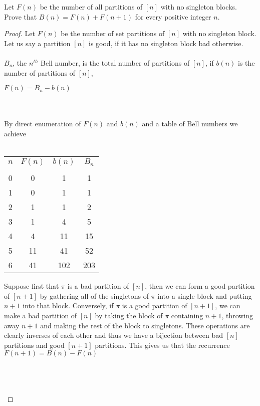 \documentclass[12pt]{article}
\newenvironment{problem}[2][Problem]{\begin{trivlist}
\item[\hskip \labelsep {\bfseries #1}\hskip \labelsep {\bfseries #2.}]}{\end{trivlist}}
\begin{document}
\begin{problem}{4}
Let $F(n)$ be the number of all partitions of $[n]$ with no singleton blocks. Prove that $B(n) = F(n) + F(n+1)$ for every positive integer $n$.
\end{problem}

\begin{proof}
Let $F(n)$ be the number of set partitions of $[n]$ with no singleton block. Let us say a partition $[n]$ is good, if it has no singleton block bad otherwise. \\ \\
$B_n$, the $n^{th}$ Bell number, is the total number of partitions of $[n]$, if $b(n)$ is the number of partitions of $[n]$, \\
\centerline{$F(n) = B_n - b(n)$} \\ \\ 
By direct enumeration of $F(n)$ and $b(n)$ and a table of Bell numbers we achieve \\ \\
\begin{center}
\begin{tabular}{ c c c c}
 $n$ & $F(n)$ & $b(n)$ & $B_n$ \\ \\
 0 & 0 & 1 & 1\\  
 1 & 0 & 1 & 1 \\
 2 & 1 & 1 & 2 \\
 3 & 1 & 4 & 5 \\
 4 & 4 & 11 & 15 \\ 
 5 & 11 & 41 & 52 \\
 6 & 41 & 102 & 203 \\
\end{tabular}
\end{center}

Suppose first that $\pi$ is a bad partition of $[n]$, then we can form a good partition of $[n+1]$ by gathering all of the singletons of $\pi$ into a single block and putting $n+1$ into that block. Conversely, if $\pi$ is a good partition of $[n+1]$, we can make a bad partition of $[n]$ by taking the block of $\pi$ containing $n+1$, throwing away $n+1$ and making the rest of the block to singletons. These operations are clearly inverses of each other and thus we have a bijection between bad $[n]$ partitions and good $[n+1]$ partitions. This gives us that the recurrence $F(n+1) = B(n) - F(n)$ \\ \\
\centerline{} \\ \\
\end{proof}
\end{document}
